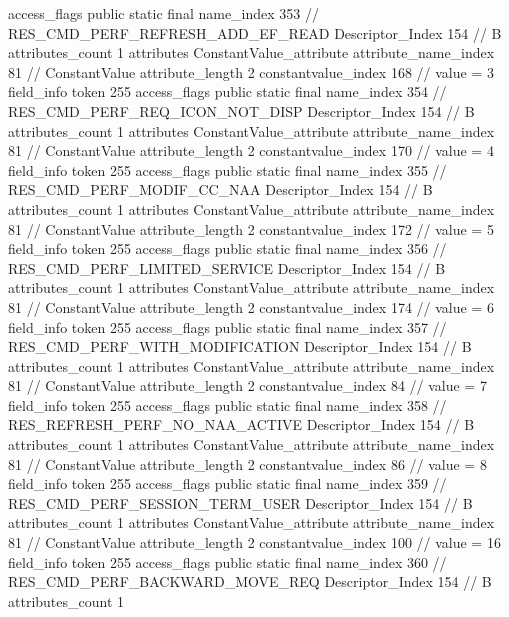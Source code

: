 {{{{{				access_flags	public static final
				name_index	353		// RES_CMD_PERF_REFRESH_ADD_EF_READ
				Descriptor_Index	154		// B
				attributes_count	1
				attributes {
				ConstantValue_attribute {
					attribute_name_index	81		// ConstantValue
					attribute_length	2
					constantvalue_index	168		// value = 3
				}
				}
			}
			field_info {
				token	255
				access_flags	public static final
				name_index	354		// RES_CMD_PERF_REQ_ICON_NOT_DISP
				Descriptor_Index	154		// B
				attributes_count	1
				attributes {
				ConstantValue_attribute {
					attribute_name_index	81		// ConstantValue
					attribute_length	2
					constantvalue_index	170		// value = 4
				}
				}
			}
			field_info {
				token	255
				access_flags	public static final
				name_index	355		// RES_CMD_PERF_MODIF_CC_NAA
				Descriptor_Index	154		// B
				attributes_count	1
				attributes {
				ConstantValue_attribute {
					attribute_name_index	81		// ConstantValue
					attribute_length	2
					constantvalue_index	172		// value = 5
				}
				}
			}
			field_info {
				token	255
				access_flags	public static final
				name_index	356		// RES_CMD_PERF_LIMITED_SERVICE
				Descriptor_Index	154		// B
				attributes_count	1
				attributes {
				ConstantValue_attribute {
					attribute_name_index	81		// ConstantValue
					attribute_length	2
					constantvalue_index	174		// value = 6
				}
				}
			}
			field_info {
				token	255
				access_flags	public static final
				name_index	357		// RES_CMD_PERF_WITH_MODIFICATION
				Descriptor_Index	154		// B
				attributes_count	1
				attributes {
				ConstantValue_attribute {
					attribute_name_index	81		// ConstantValue
					attribute_length	2
					constantvalue_index	84		// value = 7
				}
				}
			}
			field_info {
				token	255
				access_flags	public static final
				name_index	358		// RES_REFRESH_PERF_NO_NAA_ACTIVE
				Descriptor_Index	154		// B
				attributes_count	1
				attributes {
				ConstantValue_attribute {
					attribute_name_index	81		// ConstantValue
					attribute_length	2
					constantvalue_index	86		// value = 8
				}
				}
			}
			field_info {
				token	255
				access_flags	public static final
				name_index	359		// RES_CMD_PERF_SESSION_TERM_USER
				Descriptor_Index	154		// B
				attributes_count	1
				attributes {
				ConstantValue_attribute {
					attribute_name_index	81		// ConstantValue
					attribute_length	2
					constantvalue_index	100		// value = 16
				}
				}
			}
			field_info {
				token	255
				access_flags	public static final
				name_index	360		// RES_CMD_PERF_BACKWARD_MOVE_REQ
				Descriptor_Index	154		// B
				attributes_count	1
}}}}}
